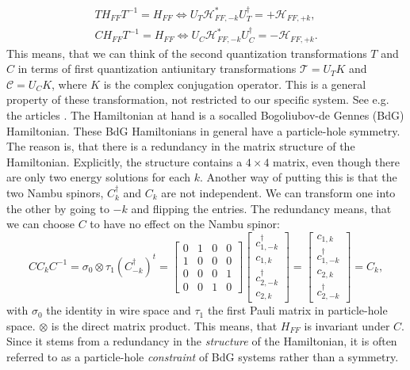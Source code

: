 \begin{align}
TH_{FF}T^{-1} = H_{FF} \Leftrightarrow U_T\mathcal{H}^*_{FF,-k} U^\dagger_T = + \mathcal{H}_{FF,+k}, \nonumber \\
CH_{FF}T^{-1} = H_{FF} \Leftrightarrow U_C\mathcal{H}^*_{FF,-k} U^\dagger_C = - \mathcal{H}_{FF,+k}. 
\label{eq.Symmetryrequirements}
\end{align}
This means, that we can think of the second quantization transformations $T$ and $C$ in terms of first quantization antiunitary transformations $\mathcal{T} = U_TK$ and $\mathcal{C} = U_CK$, where $K$ is the complex conjugation operator. This is a general property of these transformation, not restricted to our specific system. See e.g. the articles \cite{Ludwig.Topology, Chiu.Topology}. The Hamiltonian at hand is a socalled Bogoliubov-de Gennes (BdG) Hamiltonian. These BdG Hamiltonians in general have a particle-hole symmetry. The reason is, that there is a redundancy in the matrix structure of the Hamiltonian. Explicitly, the structure contains a $4\times 4$ matrix, even though there are only two energy solutions for each $k$. Another way of putting this is that the two Nambu spinors, $C^\dagger_k$ and $C_k$ are not independent. We can transform one into the other by going to $-k$ and flipping the entries. The redundancy means, that we can choose $C$ to have no effect on the Nambu spinor:
\begin{equation}
C C_k C^{-1} =  \sigma_0\otimes \tau_1 (C^\dagger_{-k})^t = \begin{bmatrix} 0 & 1 & 0 & 0 \\ 1 & 0 & 0 & 0 \\ 0 & 0 & 0 & 1 \\ 0 & 0 & 1 & 0 \end{bmatrix} \begin{bmatrix} c^\dagger_{1,-k} \\ c_{1,k} \\ c^\dagger_{2,-k} \\ c_{2,k} \end{bmatrix} = \begin{bmatrix} c_{1,k} \\ c^\dagger_{1,-k} \\ c_{2,k} \\ c^\dagger_{2,-k} \end{bmatrix} = C_k,
\end{equation}
with $\sigma_0$ the identity in wire space and $\tau_1$ the first Pauli matrix in particle-hole space. $\otimes$ is the direct matrix product. This means, that $H_{FF}$ is invariant under $C$. Since it stems from a redundancy in the \textit{structure} of the Hamiltonian, it is often referred to as a particle-hole \textit{constraint} of BdG systems rather than a symmetry.

